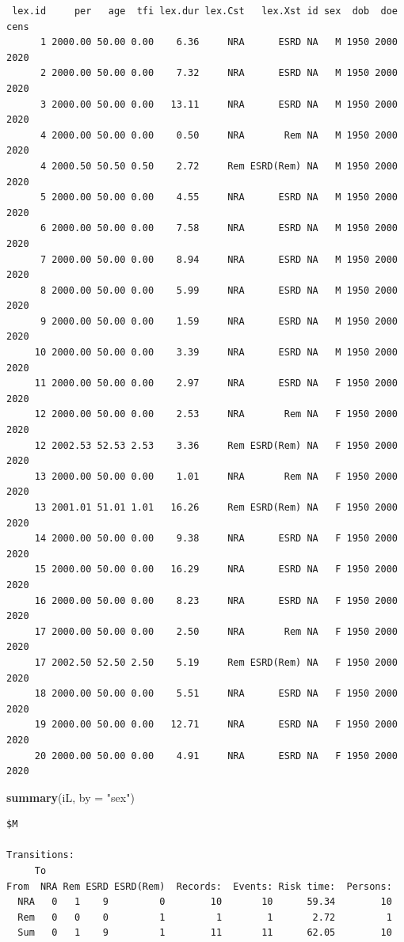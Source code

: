 \documentclass[
]{book}
\newenvironment{Shaded}{\begin{snugshade}}{\end{snugshade}}
\newcommand{\AttributeTok}[1]{\textcolor[rgb]{0.13,0.29,0.53}{#1}}
\newcommand{\FunctionTok}[1]{\textcolor[rgb]{0.13,0.29,0.53}{\textbf{#1}}}
\newcommand{\NormalTok}[1]{#1}
\newcommand{\StringTok}[1]{\textcolor[rgb]{0.31,0.60,0.02}{#1}}
\begin{document}
\begin{enumerate}
\begin{verbatim}
 lex.id     per   age  tfi lex.dur lex.Cst   lex.Xst id sex  dob  doe cens
      1 2000.00 50.00 0.00    6.36     NRA      ESRD NA   M 1950 2000 2020
      2 2000.00 50.00 0.00    7.32     NRA      ESRD NA   M 1950 2000 2020
      3 2000.00 50.00 0.00   13.11     NRA      ESRD NA   M 1950 2000 2020
      4 2000.00 50.00 0.00    0.50     NRA       Rem NA   M 1950 2000 2020
      4 2000.50 50.50 0.50    2.72     Rem ESRD(Rem) NA   M 1950 2000 2020
      5 2000.00 50.00 0.00    4.55     NRA      ESRD NA   M 1950 2000 2020
      6 2000.00 50.00 0.00    7.58     NRA      ESRD NA   M 1950 2000 2020
      7 2000.00 50.00 0.00    8.94     NRA      ESRD NA   M 1950 2000 2020
      8 2000.00 50.00 0.00    5.99     NRA      ESRD NA   M 1950 2000 2020
      9 2000.00 50.00 0.00    1.59     NRA      ESRD NA   M 1950 2000 2020
     10 2000.00 50.00 0.00    3.39     NRA      ESRD NA   M 1950 2000 2020
     11 2000.00 50.00 0.00    2.97     NRA      ESRD NA   F 1950 2000 2020
     12 2000.00 50.00 0.00    2.53     NRA       Rem NA   F 1950 2000 2020
     12 2002.53 52.53 2.53    3.36     Rem ESRD(Rem) NA   F 1950 2000 2020
     13 2000.00 50.00 0.00    1.01     NRA       Rem NA   F 1950 2000 2020
     13 2001.01 51.01 1.01   16.26     Rem ESRD(Rem) NA   F 1950 2000 2020
     14 2000.00 50.00 0.00    9.38     NRA      ESRD NA   F 1950 2000 2020
     15 2000.00 50.00 0.00   16.29     NRA      ESRD NA   F 1950 2000 2020
     16 2000.00 50.00 0.00    8.23     NRA      ESRD NA   F 1950 2000 2020
     17 2000.00 50.00 0.00    2.50     NRA       Rem NA   F 1950 2000 2020
     17 2002.50 52.50 2.50    5.19     Rem ESRD(Rem) NA   F 1950 2000 2020
     18 2000.00 50.00 0.00    5.51     NRA      ESRD NA   F 1950 2000 2020
     19 2000.00 50.00 0.00   12.71     NRA      ESRD NA   F 1950 2000 2020
     20 2000.00 50.00 0.00    4.91     NRA      ESRD NA   F 1950 2000 2020
\end{verbatim}

\begin{Shaded}
\begin{Highlighting}[]
\FunctionTok{summary}\NormalTok{(iL, }\AttributeTok{by =} \StringTok{"sex"}\NormalTok{)}
\end{Highlighting}
\end{Shaded}

\begin{verbatim}
$M

Transitions:
     To
From  NRA Rem ESRD ESRD(Rem)  Records:  Events: Risk time:  Persons:
  NRA   0   1    9         0        10       10      59.34        10
  Rem   0   0    0         1         1        1       2.72         1
  Sum   0   1    9         1        11       11      62.05        10


\end{verbatim}
\end{enumerate}
\end{document}

